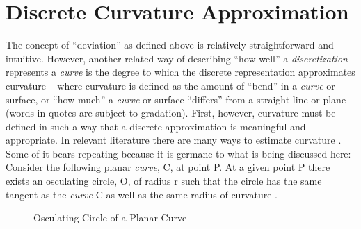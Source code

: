 \section{Discrete Curvature Approximation}
The concept of ``deviation'' as defined above is relatively 
straightforward and intuitive. However, another related way of describing 
``how well'' a \textit{discretization} represents a \textit{curve} is the 
degree to which the discrete representation approximates curvature -- 
where curvature is defined as the amount of ``bend'' in a \textit{curve} or surface, or ``how much'' a \textit{curve} or surface ``differs'' from a straight line or plane (words in quotes are subject to gradation). First, however, curvature must be defined in such a way that a discrete approximation is meaningful and appropriate. In relevant literature there are many ways to estimate curvature \cite{hermann07}. Some of it bears repeating because it is germane to what is being discussed here: Consider the following planar \textit{curve}, C, at point P. At a given point P there exists an osculating circle, O, of radius r such that the circle has the same tangent as the \textit{curve} C as well as the same radius of curvature \cite{gray97}. \\

\begin{figure}[h!]
  \caption{\label{OsculatingCircle} Osculating Circle of a Planar Curve}
\end{figure}

